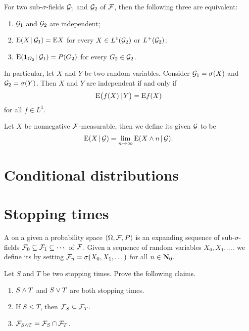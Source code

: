 \begin{prop}
    For two sub-$\sigma$-fields $\mathcal{G}_1$ and $\mathcal{G}_2$ of $\mathcal{F}$, then the following three are equivalent:
    \begin{enumerate}
        \item $\mathcal{G}_1$ and $\mathcal{G}_2$ are independent;
        \item \label{enu:indep-sub-sigma-fields} $\mathop{}\!\mathrm{E}(X\,|\, \mathcal{G}_1) = \mathop{}\!\mathrm{E} X$ for every $X \in L^1(\mathcal{G}_2)$ or $L^+(\mathcal{G}_2)$;
        \item $\mathop{}\!\mathrm{E}(\mathbf{1}_{G_2} \,|\, \mathcal G_1) = P(G_2)$ for every $G_2 \in \mathcal{G}_2$.
    \end{enumerate}
\end{prop}

In particular, let $X$ and $Y$ be two random variables. Consider $\mathcal{G}_1 = \sigma(X)$ and $\mathcal{G}_2 = \sigma(Y)$. Then $X$ and $Y$ are independent if and only if \[
    \mathop{}\!\mathrm{E}\bigl(f(X) \,|\, Y\bigr) = \mathop{}\!\mathrm{E} f(X)
\] for all $f \in L^1$.

\begin{defn}
    Let $X$ be nonnegative $\mathcal{F}$-measurable, then we define its  given $\mathcal{G}$ to be \[
        \mathop{}\!\mathrm{E}(X \,|\, \mathcal{G}) = \lim_{n \to \infty} \mathop{}\!\mathrm{E}(X \land n \,|\, \mathcal{G}).
    \]
\end{defn}

\section{Conditional distributions}

\section{Stopping times}
A  on a given a probability space $(\Omega,\mathcal{F},P)$ is an expanding sequence of sub-$\sigma$-fields $\mathcal{F}_0 \subseteq \mathcal{F}_1\subseteq \dotsb$ of $\mathcal{F}$. Given a sequence of random variables $X_0, X_1, \dotsc$. we define its  by setting $\mathcal{F}_n = \sigma(X_0,X_1,\dotsc)$ for all $n\in \mathbf{N}_0$. 

\begin{xca}
Let $S$ and $T$ be two stopping times. Prove the following claims.
    \begin{enumerate}
        \item $S\land T$ and $S \lor T$ are both stopping times.
        \item If $S \leq T$, then $\mathcal{F}_S \subseteq \mathcal{F}_T$.
        \item $\mathcal{F}_{S\land T} = \mathcal{F}_S \cap \mathcal{F}_T$.
    \end{enumerate}
\end{xca}

